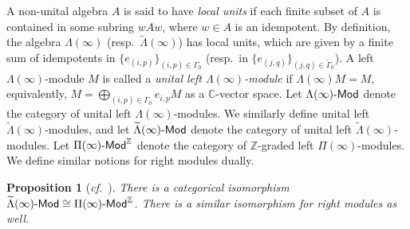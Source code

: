 \documentclass[12pt]{amsart}
\newtheorem{proposition}[theorem]{Proposition}
\theoremstyle{definition}
\theoremstyle{remark}
\numberwithin{equation}{section}
\newcommand{\confer}{\textit{cf.}\ }
\begin{document}
A non-unital algebra $A$ is said to have {\em local units} if each finite subset of $A$ is contained in some subring $wAw$, where $w\in A$ is an idempotent. By definition, the algebra $\Lambda(\infty)$ (resp.\ $\widetilde{\Lambda}(\infty)$) has local units, which are given by a finite sum of idempotents in $\{e_{(i,p)}\}_{(i,p) \in \Gamma_0}$ (resp.\ in $\{e_{(j,q)}\}_{(j,q)\in \widetilde{\Gamma}_0}$). 
A left $\Lambda(\infty)$-module $M$ is called a \emph{unital left $\Lambda(\infty)$-module} 
if $\Lambda(\infty)M=M$, equivalently,
 $M = \bigoplus_{(i,p) \in \Gamma_0} e_{i,p}M$ as a $\mathbb{C}$-vector space. Let $\Lambda(\infty)\mathchar`-\mathsf{Mod}$ denote the category of unital left $\Lambda(\infty)$-modules. We similarly define unital left $\widetilde{\Lambda}(\infty)$-modules, and let $\widetilde{\Lambda}(\infty)\mathchar`-\mathsf{Mod}$ denote the category of unital left $\widetilde{\Lambda}(\infty)$-modules. Let $\Pi(\infty)\mathchar`-\mathsf{Mod}^\mathbb{Z}$ denote the category of $\mathbb{Z}$-graded left $\Pi(\infty)$-modules. We define similar notions for right modules dually.
\begin{proposition}[{\confer \cite[Remark 4.3 \& Proposition 4.4]{FM}}] \label{rem:compare-gpa}
    There is a categorical isomorphism $\widetilde{\Lambda}(\infty)\mathchar`-\mathsf{Mod} \cong \Pi(\infty)\mathchar`-\mathsf{Mod}^\mathbb{Z}$. There is a similar isomorphism for right modules as well.
\end{proposition}
\end{document}
